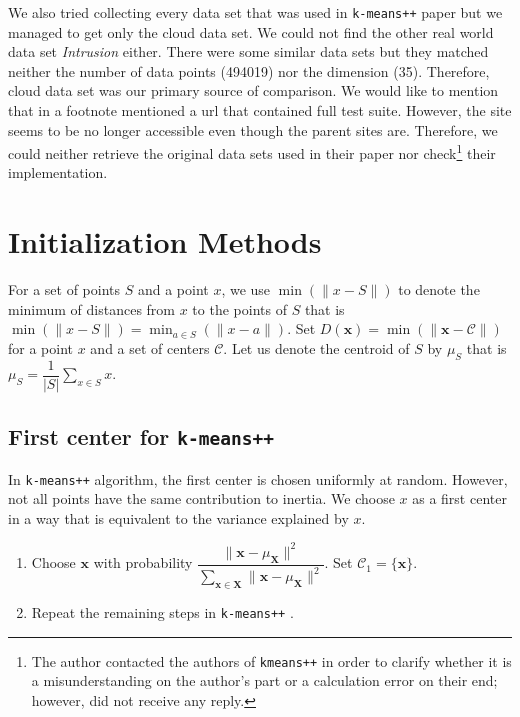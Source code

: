 \documentclass[12pt]{article}
\newcommand{\x}{\mathbf{x}}
\newcommand{\X}{\mathbf{X}}
\newcommand{\C}{\mathcal{C}}
\begin{document}
	We also tried collecting every data set that was used in \texttt{k-means++} paper but we managed to get only the cloud data set. We could not find the other real world data set \textit{Intrusion} either. There were some similar data sets but they matched neither the number of data points (494019) nor the dimension (35). Therefore, cloud data set was our primary source of comparison. We would like to mention that in a footnote \textcite[Section $6$, page $8$]{arthur_vassilvitskii_2007} mentioned a url that contained full test suite. However, the site seems to be no longer accessible even though the parent sites are. Therefore, we could neither retrieve the original data sets used in their paper nor check\footnote{The author contacted the authors of \texttt{kmeans++} in order to clarify whether it is a misunderstanding on the author's part or a calculation error on their end; however, did not receive any reply.} their implementation.
	\section{Initialization Methods}
	For a set of points $S$ and a point $x$, we use $\min(\|x-S\|)$ to denote the minimum of distances from $x$ to the points of $S$ that is $\min(\| x-S\|)=\min_{a\in S}(\| x-a\|)$. Set $D(\x)=\min(\|\x-\C\|)$ for a point $x$ and a set of centers $\C$. Let us denote the centroid of $S$ by $\mu_S$ that is $\mu_S=\dfrac{1}{|S|}\sum_{x\in S}x$.
	\subsection{First center for \texttt{k-means++}}\label{sec:first_center}
	In \texttt{k-means++} algorithm, the first center is chosen uniformly at random. However, not all points have the same contribution to inertia. We choose $x$ as a first center in a way that is equivalent to the variance explained by $x$.
	\begin{enumerate}[i]
		\item Choose $\x$ with probability $\dfrac{\|\x-\mu_{\X}\|^2}{\sum_{\x\in\X}\|\x-\mu_{\X}\|^2}$. Set $\C_1=\{\x\}$.\label{step:first_center}
		\item Repeat the remaining steps in \texttt{k-means++} \cite[Section $2.2$, Page $3$]{arthur_vassilvitskii_2007}.
	\end{enumerate}
\end{document}
